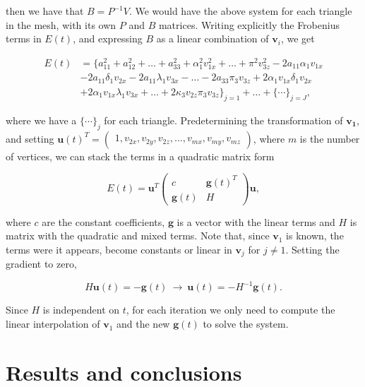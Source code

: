 \documentclass[12pt]{article}
\begin{document}
then we have that $B = P^{-1}V$.
We would have the above system for each triangle in the mesh, with its own $P$ and $B$ matrices.  
Writing explicitly the Frobenius terms in $E(t)$, and expressing $B$ as a linear combination of $\mathbf{v}_i$, we get

\begin{align*}
E(t) &= \lbrace a_{11}^2 + a_{12}^2 + \ldots + a_{33}^2 + \alpha_1^2 v_{1x}^2 + \ldots + \pi^2 v_{3z}^2 - 2 a_{11} \alpha_1 v_{1x} \\
& - 2 a_{11} \delta_1 v_{2x} - 2 a_{11} \lambda_1 v_{3x} - \ldots - 2 a_{33} \pi_3 v_{3z} + 2 \alpha_1 v_{1x} \delta_1 v_{2x} \\ 
& + 2 \alpha_1 v_{1x} \lambda_1 v_{3x} + \ldots + 2 \kappa_3 v_{2z} \pi_3 v_{3z} \rbrace_{j = 1} + \ldots + \lbrace \cdots \rbrace_{j = J},
\end{align*}

where we have a $\lbrace \cdots \rbrace_j$ for each triangle.
Predetermining the transformation of $\mathbf{v_1}$, and setting 
$\mathbf{u}(t)^T = \begin{pmatrix} 1, v_{2x}, v_{2y}, v_{2z}, \ldots, v_{mx}, v_{my}, v_{mz} \end{pmatrix}$, where $m$ is the number of vertices, we can stack the terms in a quadratic matrix form 

\begin{equation*}
E(t) = \mathbf{u}^T  \begin{pmatrix}
c & \mathbf{g}(t)^T \\
\mathbf{g}(t) & H
\end{pmatrix} \mathbf{u},
\end{equation*}

where $c$ are the constant coefficients, $\mathbf{g}$ is a vector with the linear terms and $H$ is matrix with the quadratic and mixed terms.
Note that, since $\mathbf{v}_1$ is known, the terms were it appears, become constants or linear in $\mathbf{v}_j$ for $j \neq 1$.
Setting the gradient to zero,

\begin{equation*}
H \mathbf{u}(t) = -\mathbf{g}(t) ~ \rightarrow ~ \mathbf{u}(t) = - H ^{-1} \mathbf{g}(t).
\end{equation*}

Since $H$ is independent on $t$, for each iteration we only need to compute the linear interpolation of $\mathbf{v}_1$ and the new $\mathbf{g}(t)$ to solve the system.

\section{Results and conclusions}
\end{document}
